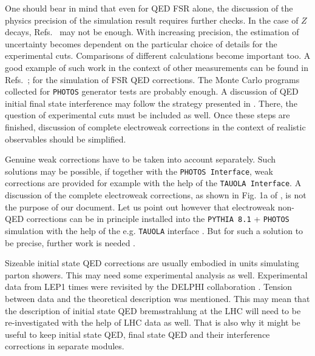 \documentclass[]{Photos_interface_design}
\begin{document}
One should bear in mind that even for QED FSR alone, the discussion of the physics 
precision of the simulation result requires further checks. In the case of 
$Z$ decays, Refs.~\cite{Golonka:2005pn,Golonka:2006tw} may not be enough.
With increasing precision, the estimation of uncertainty becomes dependent on 
the particular choice of details for the experimental cuts. Comparisons of different
calculations become important too. A good example of such work in the context of 
other measurements can be found in Refs.~\cite{Jadach:1995pd,Arbuzov:1996eq}; 
for the simulation of 
FSR QED corrections. The Monte Carlo programs collected for {\tt PHOTOS} generator 
tests are probably enough. 
A discussion of QED initial final state interference may follow the strategy presented
in \cite{Jadach:1999gz}. There, the question of experimental cuts must be included 
as well. Once these steps are finished, discussion 
of complete electroweak corrections in the context of realistic observables should 
be simplified.



Genuine weak corrections have to be taken into account separately.
Such solutions may be possible,  if together with the {\tt PHOTOS Interface},
 weak corrections are provided for example with the help of the {\tt TAUOLA Interface}.
A discussion
of the complete electroweak corrections, as shown in Fig. 1a of  \cite{Adam:2008ge},
is not the purpose of our document. Let us point out however that electroweak 
non-QED corrections can be in principle installed into the {\tt PYTHIA 8.1} + {\tt PHOTOS} simulation with 
the help of the e.g. {\tt TAUOLA} interface \cite{Davidson:2010rw}.
But for such a solution to be precise, further work is needed \cite{Bardin-private}.

Sizeable initial state QED corrections are usually embodied in  units 
simulating parton showers. This may need some experimental analysis as well. 
Experimental data from LEP1 times were revisited by the DELPHI collaboration \cite{Abdallah:2010tk}.
Tension between data and the theoretical description was
mentioned. This may mean that the description of initial state QED bremsstrahlung 
at the LHC will need to be re-investigated with the help of LHC data as well.
That is also why it  might be useful to keep initial state QED, final state QED and their interference corrections in separate modules. 

\end{document}
